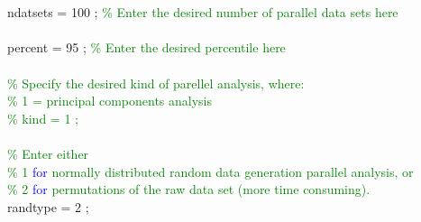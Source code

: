 \hspace{1mm}\indent \indent \indent \indent \indent \indent  \\ 
\hspace{1mm}\indent \indent \indent \indent \indent \indent  \\ 
\hspace{1mm}\indent \indent \indent \indent \indent \indent ndatsets  = 100  ; \textcolor{green}{\% Enter the desired number of parallel data sets here }\\ 
\hspace{1mm}\indent \indent \indent \indent \indent \indent  \\ 
\hspace{1mm}\indent \indent \indent \indent \indent \indent percent   = 95  ; \textcolor{green}{\% Enter the desired percentile here }\\ 
\hspace{1mm}\indent \indent \indent \indent \indent \indent  \\ 
\hspace{1mm}\indent \indent \indent \indent \indent \indent \textcolor{green}{\% Specify the desired kind of parellel analysis, where: }\\ 
\hspace{1mm}\indent \indent \indent \indent \indent \indent \textcolor{green}{\% 1 = principal components analysis }\\ 
\hspace{1mm}\indent \indent \indent \indent \indent \indent \textcolor{green}{\% kind = 1 ; }\\ 
\hspace{1mm}\indent \indent \indent \indent \indent \indent  \\ 
\hspace{1mm}\indent \indent \indent \indent \indent \indent \textcolor{green}{\% Enter either }\\ 
\hspace{1mm}\indent \indent \indent \indent \indent \indent \textcolor{green}{\%  1 \textcolor{blue}{for} normally distributed random data generation parallel analysis, or }\\ 
\hspace{1mm}\indent \indent \indent \indent \indent \indent \indent \textcolor{green}{\%  2 \textcolor{blue}{for} permutations of the raw data set (more time consuming). }\\ 
\hspace{1mm}\indent \indent \indent \indent \indent \indent \indent \indent randtype = 2 ; \\ 
